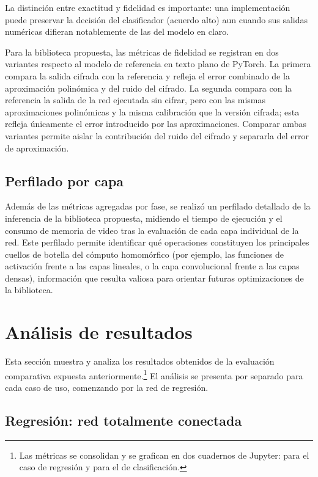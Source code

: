 La distinción entre exactitud y fidelidad es importante: una implementación puede preservar la decisión del clasificador (acuerdo alto) aun cuando sus salidas numéricas difieran notablemente de las del modelo en claro.

Para la biblioteca propuesta, las métricas de fidelidad se registran en dos variantes respecto al modelo de referencia en texto plano de PyTorch. La primera compara la salida cifrada con la referencia y refleja el error combinado de la aproximación polinómica y del ruido del cifrado. La segunda compara con la referencia la salida de la red ejecutada sin cifrar, pero con las mismas aproximaciones polinómicas y la misma calibración que la versión cifrada; esta refleja únicamente el error introducido por las aproximaciones. Comparar ambas variantes permite aislar la contribución del ruido del cifrado y separarla del error de aproximación.

\subsection{Perfilado por capa}

Además de las métricas agregadas por fase, se realizó un perfilado detallado de la inferencia de la biblioteca propuesta, midiendo el tiempo de ejecución y el consumo de memoria de video tras la evaluación de cada capa individual de la red. Este perfilado permite identificar qué operaciones constituyen los principales cuellos de botella del cómputo homomórfico (por ejemplo, las funciones de activación frente a las capas lineales, o la capa convolucional frente a las capas densas), información que resulta valiosa para orientar futuras optimizaciones de la biblioteca.

\section{Análisis de resultados}\label{sec:metodo_resultados}

Esta sección muestra y analiza los resultados obtenidos de la evaluación comparativa expuesta anteriormente.\footnote{Las métricas se consolidan y se grafican en dos cuadernos de Jupyter:  para el caso de regresión y  para el de clasificación.} El análisis se presenta por separado para cada caso de uso, comenzando por la red de regresión.

\subsection{Regresión: red totalmente conectada}\label{sec:res_mlp}

